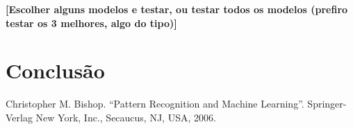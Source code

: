 \documentclass[conference]{IEEEtran}
\begin{document}
\textbf{[Escolher alguns modelos e testar, ou testar todos os modelos (prefiro testar os 3 melhores, algo do tipo)]}




\section{Conclusão} \label{sec:conc}


\begin{thebibliography}{00}
 Christopher M. Bishop. ``Pattern Recognition and Machine Learning''. Springer-Verlag New York, Inc., Secaucus, NJ, USA, 2006.
\end{thebibliography}
\end{document}
